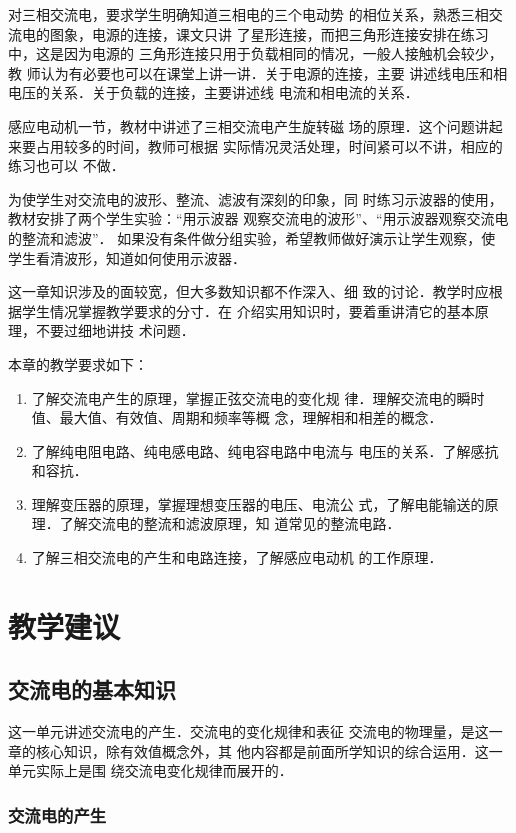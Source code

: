 对三相交流电，要求学生明确知道三相电的三个电动势
的相位关系，熟悉三相交流电的图象，电源的连接，课文只讲
了星形连接，而把三角形连接安排在练习中，这是因为电源的
三角形连接只用于负载相同的情况，一般人接触机会较少，教
师认为有必要也可以在课堂上讲一讲．关于电源的连接，主要
讲述线电压和相电压的关系．关于负载的连接，主要讲述线
电流和相电流的关系．

感应电动机一节，教材中讲述了三相交流电产生旋转磁
场的原理．这个问题讲起来要占用较多的时间，教师可根据
实际情况灵活处理，时间紧可以不讲，相应的练习也可以
不做．

为使学生对交流电的波形、整流、滤波有深刻的印象，同
时练习示波器的使用，教材安排了两个学生实验：“用示波器
观察交流电的波形”、“用示波器观察交流电的整流和滤波”．
如果没有条件做分组实验，希望教师做好演示让学生观察，使
学生看清波形，知道如何使用示波器．

这一章知识涉及的面较宽，但大多数知识都不作深入、细
致的讨论．教学时应根据学生情况掌握教学要求的分寸．在
介绍实用知识时，要着重讲清它的基本原理，不要过细地讲技
术问题．

本章的教学要求如下：
\begin{enumerate}
\item 了解交流电产生的原理，掌握正弦交流电的变化规
律．理解交流电的瞬时值、最大值、有效值、周期和频率等概
念，理解相和相差的概念．
\item 了解纯电阻电路、纯电感电路、纯电容电路中电流与
电压的关系．了解感抗和容抗．
\item 理解变压器的原理，掌握理想变压器的电压、电流公
式，了解电能输送的原理．了解交流电的整流和滤波原理，知
道常见的整流电路．
\item 了解三相交流电的产生和电路连接，了解感应电动机
的工作原理．
\end{enumerate}

\section{教学建议}
\subsection{交流电的基本知识}
这一单元讲述交流电的产生．交流电的变化规律和表征
交流电的物理量，是这一章的核心知识，除有效值概念外，其
他内容都是前面所学知识的综合运用．这一单元实际上是围
绕交流电变化规律而展开的．

\subsubsection{交流电的产生}

